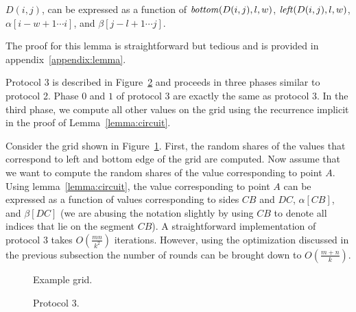 \begin{lemma}
\rm
\label{lemma:circuit}
$D(i,j)$, can be expressed as a function of ${\it bottom}(D(i,j),l,w)$,
${\it left}(D(i,j),l,w)$, $ \alpha [ i-w+1 \cdots  i ]$, and $\beta [ j-l+1 \cdots j]$.
\end{lemma}
The proof for this lemma is straightforward but tedious and is provided in appendix~\ref{appendix:lemma}.


Protocol 3 is described in Figure~\ref{fig:protocol-3} and proceeds in
three phases similar to protocol 2.  Phase $0$ and $1$ of protocol 3 are
exactly the same as protocol 3. In the third phase, we compute all other
values on the grid using the recurrence implicit in the proof of
Lemma~\ref{lemma:circuit}.

Consider the grid shown in Figure~\ref{fig:grid}.  First, the random
shares of the values that correspond to left and bottom edge of the grid
are computed.  Now assume that we want to compute the random shares of
the value corresponding to point $A$. Using lemma~\ref{lemma:circuit},
the value corresponding to point $A$ can be expressed as a function of
values corresponding to sides $CB$ and $DC$, $\alpha [CB]$, and $\beta
[DC]$ (we are abusing the notation slightly by using $CB$ to denote all
indices that lie on the segment $CB$). A straightforward implementation
of protocol $3$ takes $O( \frac{mn}{k^2})$ iterations. However, using
the optimization discussed in the previous subsection the number of
rounds can be brought down to $O(\frac{m+n}{k})$.



\begin{figure}
\centering
\caption{Example grid.}
\label{fig:grid}
\end{figure}

\begin{figure}
\caption{Protocol 3.}
\label{fig:protocol-3}
\end{figure}
